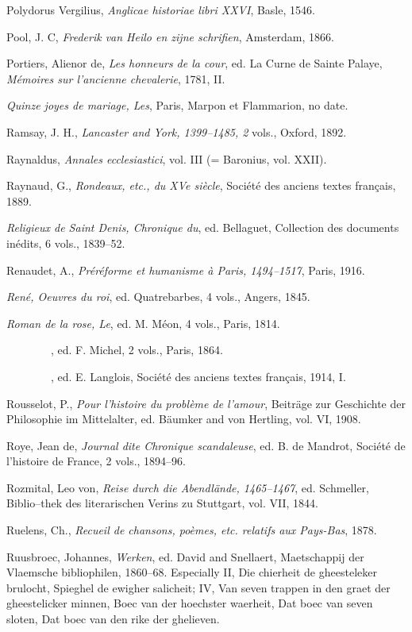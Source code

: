 Polydorus Vergilius, \emph{Anglicae historiae libri XXVI}, Basle, 1546.

Pool, J. C, \emph{Frederik van Heilo en zijne schrifien}, Amsterdam,
1866.

Portiers, Alienor de, \emph{Les honneurs de la cour}, ed. La Curne de
Sainte Palaye, \emph{Mémoires sur l'ancienne chevalerie}, 1781, II.

\emph{Quinze joyes de mariage, Les}, Paris, Marpon et Flammarion, no
date.

Ramsay, J. H., \emph{Lancaster and York, 1399--1485, 2} vols., Oxford,
1892.

Raynaldus, \emph{Annales ecclesiastici}, vol. III (= Baronius, vol.
XXII).

Raynaud, G., \emph{Rondeaux, etc., du XVe siècle}, Société des anciens
textes français, 1889.

\emph{Religieux de Saint Denis, Chronique du}, ed. Bellaguet, Collection
des documents inédits, 6 vols., 1839--52.

Renaudet, A., \emph{Préréforme et humanisme à Paris, 1494--1517}, Paris,
1916.

\emph{René, Oeuvres du roi}, ed. Quatrebarbes, 4 vols., Angers, 1845.

\emph{Roman de la rose, Le}, ed. M. Méon, 4 vols., Paris, 1814.

{~~~~~~~~}, ed. F. Michel, 2 vols., Paris, 1864.

{~~~~~~~~}, ed. E. Langlois, Société des anciens textes français, 1914,
I.

Rousselot, P., \emph{Pour l'histoire du problème de l'amour}, Beiträge
zur Geschichte der Philosophie im Mittelalter, ed. Bäumker and von
Hertling, vol. VI, 1908.

Roye, Jean de, \emph{Journal dite Chronique scandaleuse}, ed. B. de
Mandrot, Société de l'histoire de France, 2 vols., 1894--96.

Rozmital, Leo von, \emph{Reise durch die Abendlände, 1465--1467}, ed.
Schmeller, Biblio--thek des literarischen Verins zu Stuttgart, vol. VII,
1844.

Ruelens, Ch., \emph{Recueil de chansons, poèmes, etc. relatifs aux
Pays-Bas}, 1878.

Ruusbroec, Johannes, \emph{Werken}, ed. David and Snellaert,
Maetschappij der Vlaemsche bibliophilen, 1860--68. Especially II, Die
chierheit de gheesteleker brulocht, Spieghel de ewigher salicheit; IV,
Van seven trappen in den graet der gheestelicker minnen, Boec van der
hoechster waerheit, Dat boec van seven sloten, Dat boec van den rike der
ghelieven.

